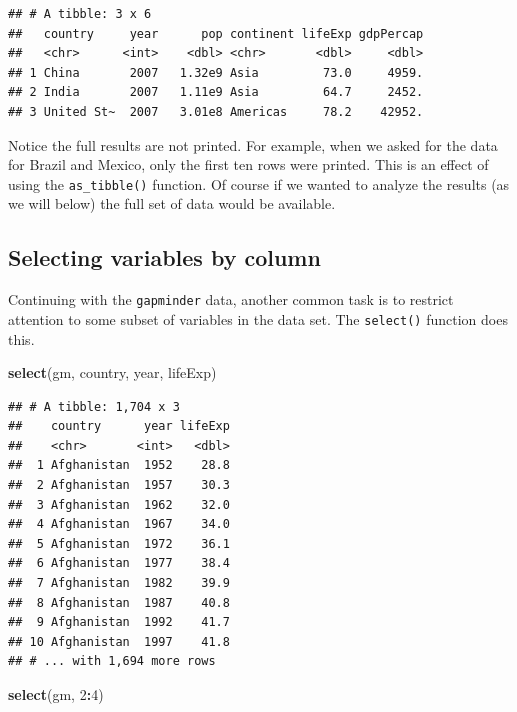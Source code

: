 \documentclass[
]{krantz}
\newenvironment{Shaded}{\begin{snugshade}}{\end{snugshade}}
\newcommand{\DecValTok}[1]{\textcolor[rgb]{0.00,0.00,0.81}{#1}}
\newcommand{\KeywordTok}[1]{\textcolor[rgb]{0.13,0.29,0.53}{\textbf{#1}}}
\newcommand{\NormalTok}[1]{#1}
\newcommand{\OperatorTok}[1]{\textcolor[rgb]{0.81,0.36,0.00}{\textbf{#1}}}
\begin{document}
\begin{verbatim}
## # A tibble: 3 x 6
##   country     year      pop continent lifeExp gdpPercap
##   <chr>      <int>    <dbl> <chr>       <dbl>     <dbl>
## 1 China       2007   1.32e9 Asia         73.0     4959.
## 2 India       2007   1.11e9 Asia         64.7     2452.
## 3 United St~  2007   3.01e8 Americas     78.2    42952.
\end{verbatim}

Notice the full results are not printed. For example, when we asked for the data for Brazil and Mexico, only the first ten rows were printed. This is an effect of using the \texttt{as\_tibble()} function. Of course if we wanted to analyze the results (as we will below) the full set of data would be available.

\hypertarget{selecting-variables-by-column}{%
\subsection{Selecting variables by column}\label{selecting-variables-by-column}}

Continuing with the \texttt{gapminder} data, another common task is to restrict attention to some subset of variables in the data set. The \texttt{select()} function does this.

\begin{Shaded}
\begin{Highlighting}[]
\KeywordTok{select}\NormalTok{(gm, country, year, lifeExp)}
\end{Highlighting}
\end{Shaded}

\begin{verbatim}
## # A tibble: 1,704 x 3
##    country      year lifeExp
##    <chr>       <int>   <dbl>
##  1 Afghanistan  1952    28.8
##  2 Afghanistan  1957    30.3
##  3 Afghanistan  1962    32.0
##  4 Afghanistan  1967    34.0
##  5 Afghanistan  1972    36.1
##  6 Afghanistan  1977    38.4
##  7 Afghanistan  1982    39.9
##  8 Afghanistan  1987    40.8
##  9 Afghanistan  1992    41.7
## 10 Afghanistan  1997    41.8
## # ... with 1,694 more rows
\end{verbatim}

\begin{Shaded}
\begin{Highlighting}[]
\KeywordTok{select}\NormalTok{(gm, }\DecValTok{2}\OperatorTok{:}\DecValTok{4}\NormalTok{)}
\end{Highlighting}
\end{Shaded}
\end{document}
